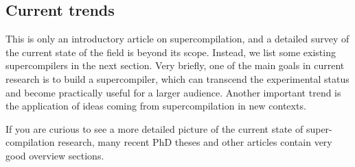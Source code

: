 \subsection{Current trends}

This is only an introductory article on supercompilation, and 
a detailed survey of the current state of the field is
beyond its scope.
Instead, we list some existing supercompilers in the next section.
Very briefly, one of the main goals in current research is to build a
supercompiler, which can transcend the experimental status
and become practically useful for a larger audience.
Another important trend is the application of ideas
coming from supercompilation in new contexts.

If you are curious to see a more detailed picture of the current
state of super-compilation research, many recent PhD theses and other articles
\cite{Sorensen1994TurchinSupercompiler,Secher1999Perfect,Secher2002DrivingBased,Mitchell2008taa,Nemytykh2008PhD,Jonsson2008Supercompilation,Klyuchnikov2010Phd,Jonsson2011Phd}
contain very good overview sections.
